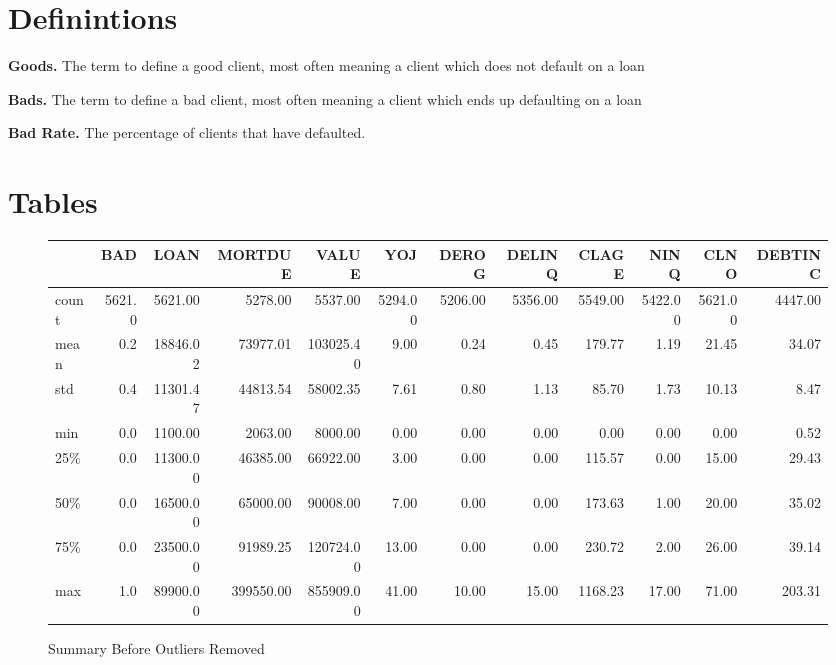 \begin{appendices}
\chapter{Definintions}

\begin{defn}
\textbf{Goods.} The term to define a good client, most often meaning a client which does not default on a loan
\end{defn}

\begin{defn}
\textbf{Bads.} The term to define a bad client, most often meaning a client which ends up defaulting on a loan
\end{defn}

\begin{defn}
\textbf{Bad Rate.} The percentage of clients that have defaulted.
\end{defn}

\chapter{Tables}

\begin{landscape}
\begin{figure}[ht]
	\centering
	\renewcommand{\arraystretch}{2}
	\begin{tabular}{lrrrrrrrrrrr}
	\toprule
	{} &     BAD &      LOAN &    MORTDUE &      VALUE &      YOJ &    DEROG &   DELINQ &    CLAGE &     NINQ &     CLNO &  DEBTINC \\
	\midrule
	count &  5621.0 &   5621.00 &    5278.00 &    5537.00 &  5294.00 &  5206.00 &  5356.00 &  5549.00 &  5422.00 &  5621.00 &  4447.00 \\
	mean  &     0.2 &  18846.02 &   73977.01 &  103025.40 &     9.00 &     0.24 &     0.45 &   179.77 &     1.19 &    21.45 &    34.07 \\
	std   &     0.4 &  11301.47 &   44813.54 &   58002.35 &     7.61 &     0.80 &     1.13 &    85.70 &     1.73 &    10.13 &     8.47 \\
	min   &     0.0 &   1100.00 &    2063.00 &    8000.00 &     0.00 &     0.00 &     0.00 &     0.00 &     0.00 &     0.00 &     0.52 \\
	25\%   &     0.0 &  11300.00 &   46385.00 &   66922.00 &     3.00 &     0.00 &     0.00 &   115.57 &     0.00 &    15.00 &    29.43 \\
	50\%   &     0.0 &  16500.00 &   65000.00 &   90008.00 &     7.00 &     0.00 &     0.00 &   173.63 &     1.00 &    20.00 &    35.02 \\
	75\%   &     0.0 &  23500.00 &   91989.25 &  120724.00 &    13.00 &     0.00 &     0.00 &   230.72 &     2.00 &    26.00 &    39.14 \\
	max   &     1.0 &  89900.00 &  399550.00 &  855909.00 &    41.00 &    10.00 &    15.00 &  1168.23 &    17.00 &    71.00 &   203.31 \\
	\bottomrule
	\end{tabular}
	\caption{Summary Before Outliers Removed \label{SUM_BFR_TBL}}
\end{figure}
\end{landscape}


\end{appendices}
